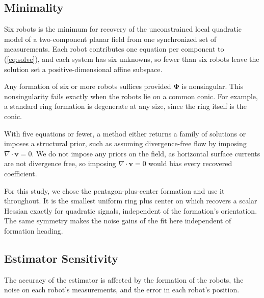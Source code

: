 \documentclass[lettersize,journal]{IEEEtran}
\begin{document}
\subsection{Minimality}
\label{sec:minimality}

Six robots is the minimum for recovery of the unconstrained local
quadratic model of a two-component planar field from one synchronized set of measurements. Each robot contributes one equation per component to
(\ref{eq:solve}), and each system has six unknowns, so fewer than six
robots leave the solution set a positive-dimensional affine subspace.

Any formation of six or more robots suffices provided
$\boldsymbol{\Phi}$ is nonsingular. This nonsingularity fails exactly
when the robots lie on a common conic. For example, a standard ring
formation is degenerate at any size, since the ring itself is the
conic.

With five equations or fewer, a method either returns a family of solutions or imposes a structural prior, such as assuming
divergence-free flow by imposing $\nabla\cdot\mathbf{v} = 0$. We do not impose any priors on the field, as horizontal surface
currents are not divergence free, so imposing
$\nabla\cdot\mathbf{v} = 0$ would bias every recovered coefficient.

For this study, we chose the pentagon-plus-center formation and use it
throughout. It is the smallest uniform ring plus center on which \cite{5}
recovers a scalar Hessian exactly for quadratic signals, independent of
the formation's orientation. The same symmetry makes the noise gains of
the fit here independent of formation heading.


\subsection{Estimator Sensitivity}
\label{sec:sensitivity}

The accuracy of the estimator is affected by the formation of the
robots, the noise on each robot's measurements, and the error in each
robot's position.
\end{document}
